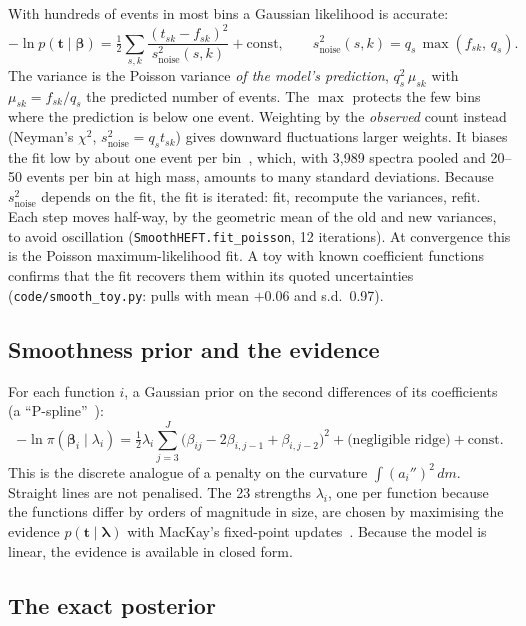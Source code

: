 \documentclass[11pt]{article}
\newcommand{\file}[1]{\nolinkurl{#1}}
\newcommand{\bbeta}{\boldsymbol{\beta}}
\newcommand{\code}[1]{\texttt{#1}}
\newcommand{\snoise}{s_{\text{noise}}}
\begin{document}
With hundreds of events in most bins a Gaussian likelihood is accurate:
\begin{equation}
  -\ln p(\boldsymbol t\mid\bbeta) = \tfrac12\sum_{s,k} \frac{(t_{sk} - f_{sk})^2}{\snoise^2(s,k)}
  + \text{const},\qquad \snoise^2(s,k) = q_s\,\max(f_{sk},\, q_s).
  \label{eq:like}
\end{equation}
The variance is the Poisson variance \emph{of the model's prediction}, $q_s^2\,\mu_{sk}$ with
$\mu_{sk} = f_{sk}/q_s$ the predicted number of events. The $\max$ protects the few bins where
the prediction is below one event. Weighting by the \emph{observed} count instead (Neyman's
$\chi^2$, $\snoise^2 = q_s t_{sk}$) gives downward fluctuations larger weights. It biases the
fit low by about one event per bin~\cite{bakercousins}, which, with 3,989 spectra pooled and
20--50 events per bin at high mass, amounts to many standard deviations. Because
$\snoise^2$ depends on the fit, the fit is iterated: fit, recompute the variances, refit. Each
step moves half-way, by the geometric mean of the old and new variances, to avoid
oscillation (\code{SmoothHEFT.fit\_poisson}, 12 iterations). At convergence this is the
Poisson maximum-likelihood fit. A toy with known coefficient functions confirms that the fit
recovers them within its quoted uncertainties (\file{code/smooth_toy.py}: pulls with mean
$+0.06$ and s.d.\ 0.97).

\subsection{Smoothness prior and the evidence}

For each function $i$, a Gaussian prior on the second differences of its coefficients (a
``P-spline''~\cite{eilers}):
\begin{equation}
  -\ln\pi(\bbeta_i\mid\lambda_i) = \tfrac12\lambda_i\sum_{j=3}^{J}
  \big(\beta_{ij} - 2\beta_{i,j-1} + \beta_{i,j-2}\big)^2 + \text{(negligible ridge)} + \text{const}.
\end{equation}
This is the discrete analogue of a penalty on the curvature $\int (a_i'')^2\,dm$. Straight lines
are not penalised. The 23 strengths $\lambda_i$, one per function because the functions
differ by orders of magnitude in size, are chosen by maximising the evidence
$p(\boldsymbol t\mid\boldsymbol\lambda)$ with MacKay's fixed-point updates~\cite{mackay}.
Because the model is linear, the evidence is available in closed form.

\subsection{The exact posterior}
\end{document}
